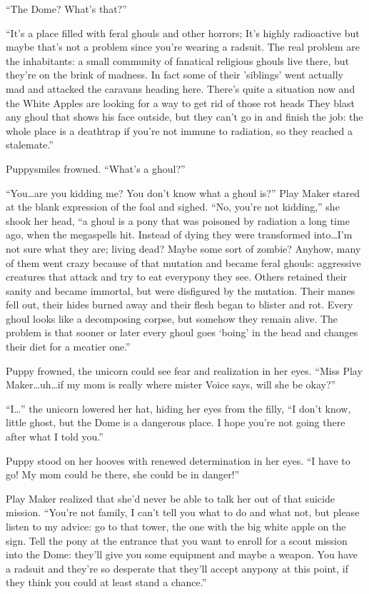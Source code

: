 ``The Dome? What's that?''

``It's a place filled with feral ghouls and other horrors; It's highly radioactive but maybe that's not a problem since you're wearing a radsuit. The real problem are the inhabitants: a small community of fanatical religious ghouls live there, but they're on the brink of madness. In fact some of their 'siblings' went actually mad and attacked the caravans heading here. There's quite a situation now and the White Apples are looking for a way to get rid of those rot heads They blast any ghoul that shows his face outside, but they can't go in and finish the job: the whole place is a deathtrap if you're not immune to radiation, so they reached a stalemate.''

Puppysmiles frowned. ``What's a ghoul?''

``You\dots are you kidding me? You don't know what a ghoul is?'' Play Maker stared at the blank expression of the foal and sighed. ``No, you're not kidding,'' she shook her head, ``a ghoul is a pony that was poisoned by radiation a long time ago, when the megaspells hit. Instead of dying they were transformed into\dots I'm not sure what they are; living dead? Maybe some sort of zombie? Anyhow, many of them went crazy because of that mutation and became feral ghouls: aggressive creatures that attack and try to eat everypony they see. Others retained their sanity and became immortal, but were disfigured by the mutation. Their manes fell out, their hides burned away and their flesh began to blister and rot. Every ghoul looks like a decomposing corpse, but somehow they remain alive. The problem is that sooner or later every ghoul goes `boing' in the head and changes their diet for a meatier one.''

Puppy frowned, the unicorn could see fear and realization in her eyes. ``Miss Play Maker\dots uh\dots if my mom is really where mister Voice says, will she be okay?''

``I\dots'' the unicorn lowered her hat, hiding her eyes from the filly, ``I don't know, little ghost, but the Dome is a dangerous place. I hope you're not going there after what I told you.''

Puppy stood on her hooves with renewed determination in her eyes. ``I have to go! My mom could be there, she could be in danger!''

Play Maker realized that she'd never be able to talk her out of that suicide mission. ``You're not family, I can't tell you what to do and what not, but please listen to my advice: go to that tower, the one with the big white apple on the sign. Tell the pony at the entrance that you want to enroll for a scout mission into the Dome: they'll give you some equipment and maybe a weapon. You have a radsuit and they're so desperate that they'll accept anypony at this point, if they think you could at least stand a chance.''

